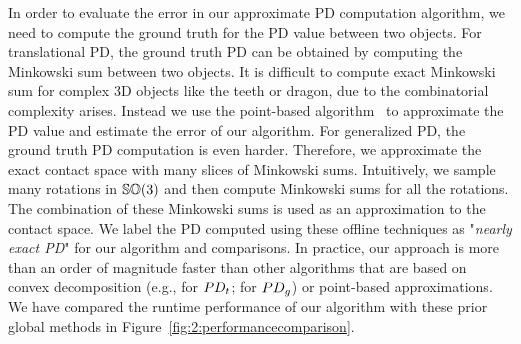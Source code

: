 In order to evaluate the error in our approximate PD computation algorithm, we need to compute the ground truth for the PD value between two objects. For translational PD, the ground truth PD can be obtained by computing the Minkowski sum between two objects. 
It is difficult to compute exact Minkowski sum for complex 3D objects like the teeth or dragon, due to the combinatorial complexity arises. Instead we use the point-based algorithm~\cite{Lien:2009:ASM} to approximate the PD value and estimate the error of our algorithm.
For generalized PD, the ground truth PD computation is even harder. Therefore, we approximate the exact contact space with many slices of Minkowski sums. Intuitively, we sample many rotations in $\mathbb {SO}(3)$ and then compute Minkowski sums for all the rotations. The combination of these Minkowski sums is used as an approximation to the contact space. We label the PD computed using these offline techniques as "\emph{nearly exact PD}" for our algorithm and comparisons.
In practice, our approach is more than an order of magnitude faster than other algorithms that are based on convex decomposition (e.g., \cite{Kim:2002:FPD} for $PD_t$; \cite{Zhang:2007:GPD} for $PD_g$) or point-based approximations. We have compared the runtime performance of our algorithm with these prior global methods in Figure~\ref{fig:2:performancecomparison}. 




